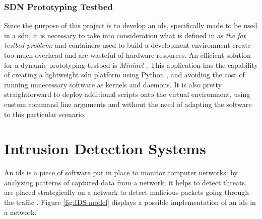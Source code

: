 
\subsubsection{SDN Prototyping Testbed}
\label{subsec:sdn-testbed}

Since the purpose of this project is to develop an \gls{ids}, specifically made to be used in a \gls{sdn}, it is necessary to take into consideration what is defined in \cite{Lantz2015} as \textit{the fat testbed problem}:  and containers used to build a development environment create too much overhead and are wasteful of hardware resources. An efficient solution for a dynamic prototyping testbed is \textit{Mininet} \cite{MininetWebsite}. This application has the capability of creating a lightweight \gls{sdn} platform using Python , and avoiding the cost of running unnecessary software as kernels and daemons. It is also pretty straightforward to deploy additional scripts onto the virtual environment, using custom command line arguments and without the need of adapting the software to this particular scenario.


\section{Intrusion Detection Systems}
\label{sec:intrusion-detection-system}

An \gls{ids} is a piece of software put in place to monitor computer networks: by analyzing patterns of captured data from a network, it helps to detect threats.  are placed strategically on a network to detect malicious packets going through the traffic \cite{Hodo2017}. Figure \ref{fig:IDS-model} displays a possible implementation of an \gls{ids} in a network.

